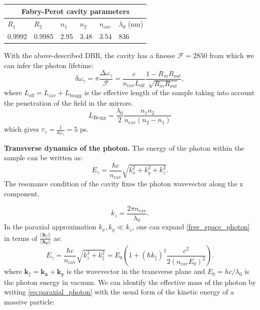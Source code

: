 \begin{center}
    \begin{tabular}{ |p{1.5cm}|p{1.5cm}|p{1.5cm}|p{1.5cm}|p{1.5cm}|p{1.5cm}|}
    \hline
    \multicolumn{6}{|c|}{Fabry-Perot cavity parameters} \\
    \hline
    \hline
    $R_1$ & $R_2$ & $n_1$ & $n_2$ & $n_{cav}$ & $\lambda_0$ (nm) \\
    \hline
    0.9992  &  0.9985 & 2.95 & 3.48 & 3.54 & 836\\
    \hline
    \end{tabular}
    \label{DBR_params}
\end{center}

With the above-described DBR, the cavity has a finesse $\mathcal{F}=2850$ from which we can infer the photon lifetime:
\begin{equation}
    \delta \omega_{\gamma} = \pi\dfrac{\Delta \omega_{\gamma}}{\mathcal{F}} = \dfrac{c}{n_{\mathrm{cav}} L_{\mathrm{eff}}} \dfrac{1-R_{in}R_{out}}{\sqrt{R_{in}R_{out}}},
\end{equation}
where $L_{\mathrm{eff}}= L_{\mathrm{cav}}+L_{\mathrm{bragg}}$ is the effective length of the sample taking into account the penetration of the field in the mirrors.
\begin{equation}
    L_{\mathrm{Bragg}} = \dfrac{\lambda_0}{2} \dfrac{n_1 n_2}{n_{\mathrm{cav}} (n_2 - n_1)}
\end{equation}
which gives $\tau_{\gamma} = \frac{1}{\delta \omega_{\gamma} }= 5$ ps.

\bigskip\noindent
\textbf{Transverse dynamics of the photon.} The energy of the photon within the sample can be written as:
\begin{equation}
    E_\gamma = \dfrac{\hbar c}{n_{\mathrm{cav}}} \sqrt{k_x^2 + k_y^2 + k_z^2}.
\label{free_space_photon}
\end{equation}
The resonance condition of the cavity fixes the photon wavevector along the z component. 

\begin{equation}
    k_z = \dfrac{2\pi n_{\mathrm{cav}}}{\lambda_0}.
    \label{eq:kz}
\end{equation}
In the paraxial approximation $k_x,k_y \ll k_z$, one can expand \eqref{free_space_photon} in terms of $\frac{||\bm{k_{\parallel}}||}{||\bm{k_z}||}$ as:
\begin{equation}
    E_\gamma = \dfrac{\hbar c}{n_{\mathrm{cav}}} \sqrt{k_z^2 + k_{\parallel}^2} = E_0 \left( 1 + (\hbar k_{\parallel })^2 \dfrac{c ^2}{2(n_{\mathrm{cav}} E_0)^2} \right).
    \label{eq:paraxial_photon}
\end{equation}
where $\bm{k_{\parallel}}=\bm{k_x}+\bm{k_y}$ is the wavevector in the transverse plane and $E_0=hc/\lambda_0$ is the photon energy in vacuum. We can identify the effective mass of the photon by writing \eqref{eq:paraxial_photon} with the usual form of the kinetic energy of a massive particle:

